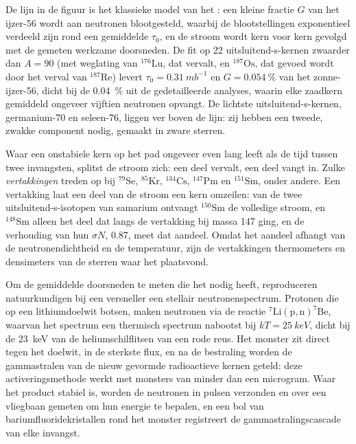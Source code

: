 De lijn in de figuur is het klassieke model van het : een kleine
fractie $G$ van het ijzer-56 wordt aan neutronen blootgesteld, waarbij de
blootstellingen exponentieel verdeeld zijn rond een gemiddelde $\tau_0$, en de
stroom wordt kern voor kern gevolgd met de gemeten werkzame doorsneden. De fit
op 22 uitsluitend-s-kernen zwaarder dan $A = 90$ (met weglating van $^{176}\mathrm{Lu}$,
dat vervalt, en $^{187}\mathrm{Os}$, dat gevoed wordt door het verval van
$^{187}\mathrm{Re}$) levert $\tau_0 = \qty{0.31}{mb^{-1}}$ en
$G = \qty{0.054}{\percent}$ van het zonne-ijzer-56, dicht bij de
\qty{0.04}{\percent} uit de gedetailleerde analyses, waarin elke zaadkern
gemiddeld ongeveer vijftien neutronen opvangt. De lichtste uitsluitend-s-kernen,
germanium-70 en seleen-76, liggen ver boven de lijn: zij hebben een
tweede, zwakke component nodig, gemaakt in zware sterren.

Waar een onstabiele kern op het pad ongeveer even lang leeft als de tijd
tussen twee invangsten, splitst de stroom zich: een deel vervalt, een deel
vangt in. Zulke \emph{vertakkingen} treden op bij $^{79}\mathrm{Se}$, $^{85}\mathrm{Kr}$,
$^{134}\mathrm{Cs}$, $^{147}\mathrm{Pm}$ en $^{151}\mathrm{Sm}$, onder andere.
Een vertakking laat een deel van de stroom een kern omzeilen: van de twee
uitsluitend-s-isotopen van samarium ontvangt $^{150}\mathrm{Sm}$ de volledige
stroom, en $^{148}\mathrm{Sm}$ alleen het deel dat langs de vertakking bij
massa 147 ging, en de verhouding van hun $\sigma N$, \num{0.87}, meet dat
aandeel. Omdat het aandeel afhangt van de neutronendichtheid en de
temperatuur, zijn de vertakkingen thermometers en densimeters van de sterren
waar het  plaatsvond.

\begin{inthelab}
Om de gemiddelde doorsneden te meten die het  nodig heeft, reproduceren
natuurkundigen bij een versneller een stellair neutronenspectrum. Protonen die
op een lithiumdoelwit botsen, maken neutronen via de reactie
$^{7}\mathrm{Li}(\mathrm{p},\mathrm{n})^{7}\mathrm{Be}$, waarvan het spectrum
een thermisch spectrum nabootst bij $kT = \qty{25}{keV}$, dicht bij de
\qty{23}{keV} van de heliumschilflitsen van een rode reus. Het monster zit
direct tegen het doelwit, in de sterkste flux, en na de bestraling worden de
gammastralen van de nieuw gevormde radioactieve kernen geteld: deze
activeringsmethode werkt met monsters van minder dan een microgram. Waar het
product stabiel is, worden de neutronen in pulsen verzonden en over een
vliegbaan gemeten om hun energie te bepalen, en een bol van
bariumfluoridekristallen rond het monster registreert de gammastralingscascade
van elke invangst.
\end{inthelab}

